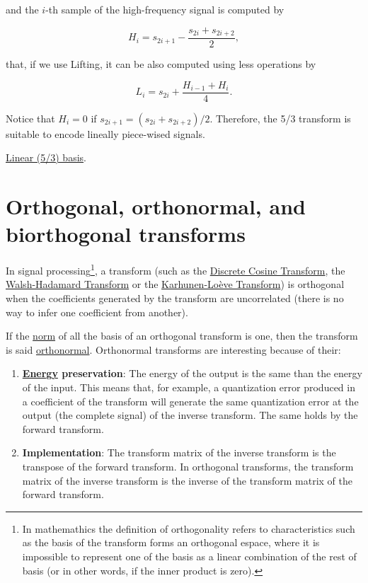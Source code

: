 and the $i$-th sample of the high-frequency signal is computed by

\begin{equation}
  H_i=s_{2i+1}-\frac{s_{2i}+s_{2i+2}}{2},
  \tag{5/3H}
  \label{eq:Lineal_A-HPF}
\end{equation}

that, if we use Lifting, it can be also computed using less operations by

\begin{equation}
  L_i=s_{2i}+\frac{H_{i-1}+H_i}{4}.
  \tag{5/3LLifted}
  \label{eq:Lineal_A-LPF_lifting}
\end{equation}

Notice that $H_i=0$ if $s_{2i+1}=(s_{2i}+s_{2i+2})/2$. Therefore, the 5/3 transform is suitable to encode lineally piece-wised signals.

\href{https://nbviewer.jupyter.org/github/vicente-gonzalez-ruiz/image_transformations_for_coding/blob/master/linear_2d_basis.ipynb}{Linear (5/3) basis}.


\section{Orthogonal, orthonormal, and biorthogonal transforms}

In signal processing\footnote{In mathemathics the definition of
  orthogonality refers to characteristics such as the basis of the
  transform forms an orthogonal espace, where it is impossible to
  represent one of the basis as a linear combination of the rest of
  basis (or in other words, if the inner product is zero).}, a
transform (such as the
\href{https://en.wikipedia.org/wiki/Discrete_cosine_transform}{Discrete
  Cosine Transform}, the
\href{https://en.wikipedia.org/wiki/Hadamard_transform}{Walsh-Hadamard
  Transform} or the
\href{https://en.wikipedia.org/wiki/Karhunen%E2%80%93Lo%C3%A8ve_theorem}{Karhunen-Loève
  Transform}) is orthogonal when the coefficients generated by the
transform are uncorrelated (there is no way to infer one coefficient
from another).

If the \href{https://en.wikipedia.org/wiki/Norm_(mathematics)}{norm}
of all the basis of an orthogonal transform is one, then the transform
is said
\href{https://en.wikipedia.org/wiki/Orthonormal_basis}{orthonormal}. Orthonormal
transforms are interesting because of their:
\begin{enumerate}
\item
  \textbf{\href{https://en.wikipedia.org/wiki/Energy_(signal_processing)}{Energy}
    preservation}: The energy of the output is the same than the
  energy of the input. This means that, for example, a quantization
  error produced in a coefficient of the transform will generate the
  same quantization error at the output (the complete signal) of the
  inverse transform. The same holds by the forward transform.
\item \textbf{Implementation}: The transform matrix of the
  inverse transform is the transpose of the forward transform. In
  orthogonal transforms, the transform matrix of the inverse transform
  is the inverse of the transform matrix of the forward transform.
\end{enumerate}

